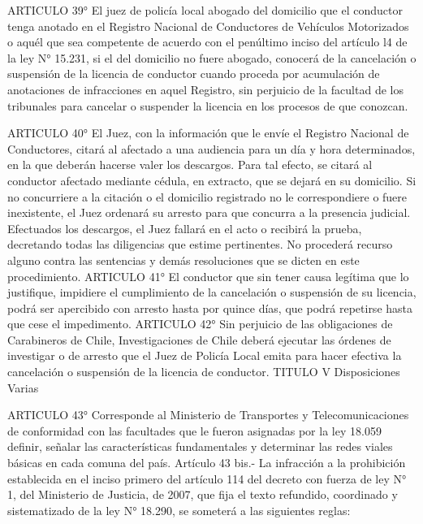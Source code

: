     ARTICULO 39° El juez de policía local abogado del domicilio que el conductor tenga anotado en el Registro Nacional de Conductores de Vehículos Motorizados o aquél que sea competente de acuerdo con el penúltimo inciso del artículo l4 de la ley N° 15.231, si el del domicilio no fuere abogado, conocerá de la cancelación o suspensión de la licencia de conductor cuando proceda por acumulación de anotaciones de infracciones en aquel Registro, sin perjuicio de la facultad de los tribunales para cancelar o suspender la licencia en los procesos de que conozcan.

    ARTICULO 40° El Juez, con la información que le envíe el Registro Nacional de Conductores, citará al afectado a una audiencia para un día y hora determinados, en la que deberán hacerse valer los descargos.
    Para tal efecto, se citará al conductor afectado mediante cédula, en extracto, que se dejará en su domicilio. Si no concurriere a la citación o el domicilio registrado no le correspondiere o fuere inexistente, el Juez ordenará su arresto para que concurra a la presencia judicial.
    Efectuados los descargos, el Juez fallará en el acto o recibirá la prueba, decretando todas las diligencias que estime pertinentes.
    No procederá recurso alguno contra las sentencias y demás resoluciones que se dicten en este procedimiento.
    ARTICULO 41° El conductor que sin tener causa legítima que lo justifique, impidiere el cumplimiento de la cancelación o suspensión de su licencia, podrá ser apercibido con arresto hasta por quince días, que podrá repetirse hasta que cese el impedimento.
    ARTICULO 42° Sin perjuicio de las obligaciones de Carabineros de Chile, Investigaciones de Chile deberá ejecutar las órdenes de investigar o de arresto que el Juez de Policía Local emita para hacer efectiva la cancelación o suspensión de la licencia de conductor.
    TITULO V
    Disposiciones Varias



    ARTICULO 43° Corresponde al Ministerio de Transportes y Telecomunicaciones de conformidad con las facultades que le fueron asignadas por la ley 18.059 definir, señalar las características fundamentales y determinar las redes viales básicas en cada comuna del país.
    Artículo 43 bis.- La infracción a la prohibición establecida en el inciso primero del artículo 114 del decreto con fuerza de ley N° 1, del Ministerio de Justicia, de 2007, que fija el texto refundido, coordinado y sistematizado de la ley N° 18.290, se someterá a las siguientes reglas:

